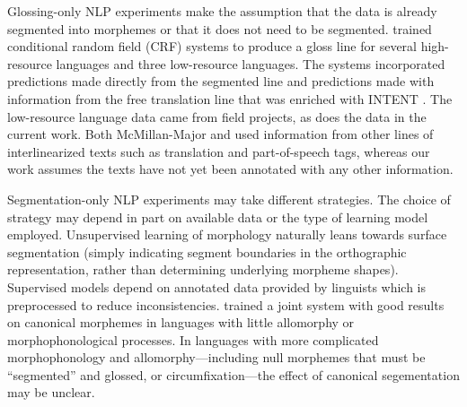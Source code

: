 Glossing-only NLP experiments make the assumption that the data is already segmented into morphemes or that it does not need to be segmented. 
\citet{mcmillan-major_automating_2020} trained conditional random field (CRF) systems to produce a gloss line for several high-resource languages and three low-resource languages. The systems incorporated predictions made directly from the segmented line and predictions made with information from the free translation line that was enriched with INTENT \citet{georgi_aari_2016}. The low-resource language data came from field projects, as does the data in the current work. Both McMillan-Major and \citet{samardzic_automatic_2015} used information from other lines of interlinearized texts such as translation and part-of-speech tags, whereas our work assumes the texts have not yet been annotated with any other information.

Segmentation-only NLP experiments may take different strategies. The choice of strategy may depend in part on available data or the type of learning model employed. Unsupervised learning of morphology naturally leans towards surface segmentation (simply indicating segment boundaries in the orthographic representation, rather than determining underlying morpheme shapes). Supervised models depend on annotated data provided by linguists which is preprocessed to reduce inconsistencies. \citet{moeller_automatic_2018} trained a joint system with good results on canonical morphemes in languages with little allomorphy or morphophonological processes.
In languages with more complicated morphophonology and allomorphy---including null morphemes that must be ``segmented'' and glossed, or circumfixation---the effect of canonical segementation may be unclear.

